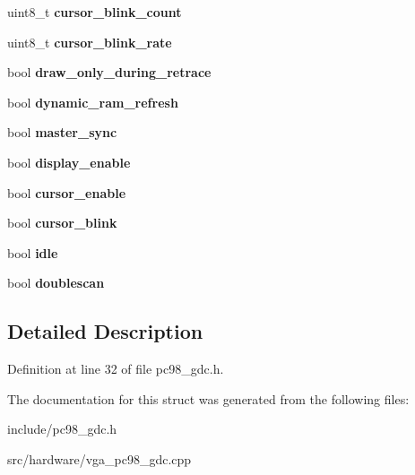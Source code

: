 \begin{DoxyCompactItemize}
\item 
\hypertarget{structPC98__GDC__state_aebd7aff24bf501c09a83521de8bc756b}{uint8\-\_\-t {\bfseries cursor\-\_\-blink\-\_\-count}}\label{structPC98__GDC__state_aebd7aff24bf501c09a83521de8bc756b}

\item 
\hypertarget{structPC98__GDC__state_a1da10b2642246d1e4315b301f91b816f}{uint8\-\_\-t {\bfseries cursor\-\_\-blink\-\_\-rate}}\label{structPC98__GDC__state_a1da10b2642246d1e4315b301f91b816f}

\item 
\hypertarget{structPC98__GDC__state_a30fc555b9d29ee7b94597c134903fa1a}{bool {\bfseries draw\-\_\-only\-\_\-during\-\_\-retrace}}\label{structPC98__GDC__state_a30fc555b9d29ee7b94597c134903fa1a}

\item 
\hypertarget{structPC98__GDC__state_ab2e743dbada1318967bd10505bcfae33}{bool {\bfseries dynamic\-\_\-ram\-\_\-refresh}}\label{structPC98__GDC__state_ab2e743dbada1318967bd10505bcfae33}

\item 
\hypertarget{structPC98__GDC__state_a2f82a64dee33666f051f2358b39b36e1}{bool {\bfseries master\-\_\-sync}}\label{structPC98__GDC__state_a2f82a64dee33666f051f2358b39b36e1}

\item 
\hypertarget{structPC98__GDC__state_a6d8c34e7786906c0bf3a71a8223b47c7}{bool {\bfseries display\-\_\-enable}}\label{structPC98__GDC__state_a6d8c34e7786906c0bf3a71a8223b47c7}

\item 
\hypertarget{structPC98__GDC__state_a2d974909bf478b470db46d7a391d45be}{bool {\bfseries cursor\-\_\-enable}}\label{structPC98__GDC__state_a2d974909bf478b470db46d7a391d45be}

\item 
\hypertarget{structPC98__GDC__state_a052103fb7ab862c6087ca893f42b1889}{bool {\bfseries cursor\-\_\-blink}}\label{structPC98__GDC__state_a052103fb7ab862c6087ca893f42b1889}

\item 
\hypertarget{structPC98__GDC__state_ace0fcb3c221beebe98c51e49be38bb2f}{bool {\bfseries idle}}\label{structPC98__GDC__state_ace0fcb3c221beebe98c51e49be38bb2f}

\item 
\hypertarget{structPC98__GDC__state_a38abe8d027dbbe87e2abeda97a7b1ebb}{bool {\bfseries doublescan}}\label{structPC98__GDC__state_a38abe8d027dbbe87e2abeda97a7b1ebb}

\end{DoxyCompactItemize}


\subsection{Detailed Description}


Definition at line 32 of file pc98\-\_\-gdc.\-h.



The documentation for this struct was generated from the following files\-:\begin{DoxyCompactItemize}
\item 
include/pc98\-\_\-gdc.\-h\item 
src/hardware/vga\-\_\-pc98\-\_\-gdc.\-cpp\end{DoxyCompactItemize}
